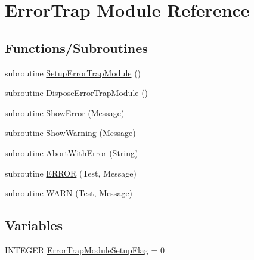 \hypertarget{namespace_error_trap}{
\section{ErrorTrap Module Reference}
\label{namespace_error_trap}
}
\subsection*{Functions/Subroutines}
\begin{DoxyCompactItemize}
\item 
subroutine \hyperlink{namespace_error_trap_a611b4303bac6ac22cc75d77d1ddd7182}{SetupErrorTrapModule} ()
\item 
subroutine \hyperlink{namespace_error_trap_a3f6ccae3b4a825f702ab38fd75114d67}{DisposeErrorTrapModule} ()
\item 
subroutine \hyperlink{namespace_error_trap_a692b52f918df54cd99082da25793d646}{ShowError} (Message)
\item 
subroutine \hyperlink{namespace_error_trap_ace2fdc9fc500ac4dffaf0a06e053b6a0}{ShowWarning} (Message)
\item 
subroutine \hyperlink{namespace_error_trap_ae80447005fe2502fdd96646cd1510389}{AbortWithError} (String)
\item 
subroutine \hyperlink{namespace_error_trap_ac61176418131d4f6becefa8914209aa6}{ERROR} (Test, Message)
\item 
subroutine \hyperlink{namespace_error_trap_a333255057ba2633db5a01b25ec3aa18e}{WARN} (Test, Message)
\end{DoxyCompactItemize}
\subsection*{Variables}
\begin{DoxyCompactItemize}
\item 
INTEGER \hyperlink{namespace_error_trap_ab0af30c4946661d94501e25bd1b61d17}{ErrorTrapModuleSetupFlag} = 0
\end{DoxyCompactItemize}


